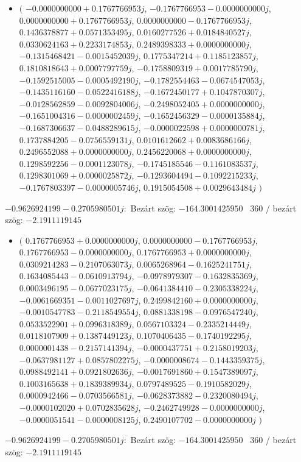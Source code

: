 \documentclass[14pt,a4paper]{article}
\begin{document}
\begin{itemize}
\item
$\big($
$-0.0000000000+0.1767766953j$, $-0.1767766953-0.0000000000j$, $0.0000000000+0.1767766953j$, $0.0000000000-0.1767766953j$, $0.1436378877+0.0571353495j$, $0.0160277526+0.0184840527j$, $0.0330624163+0.2233174853j$, $0.2489398333+0.0000000000j$, $-0.1315468421-0.0015452039j$, $0.1775347214+0.1185123857j$, $0.1810818643+0.0007797759j$, $-0.1758809319+0.0017785790j$, $-0.1592515005-0.0005492190j$, $-0.1782554463-0.0674547053j$, $-0.1435116160-0.0522416188j$, $-0.1672450177+0.1047870307j$, $-0.0128562859-0.0092804006j$, $-0.2498052405+0.0000000000j$, $-0.1651004316-0.0000002459j$, $-0.1652456329-0.0000135884j$, $-0.1687306637-0.0488289615j$, $-0.0000022598+0.0000000781j$, $0.1737884205-0.0756559131j$, $0.0101612662+0.0083686166j$, $0.2496552088+0.0000000000j$, $0.2456220068+0.0000000000j$, $0.1298592256-0.0001123078j$, $-0.1745185546-0.1161083537j$, $0.1298301069+0.0000025872j$, $-0.1293604494-0.1092215233j$, $-0.1767803397-0.0000005746j$, $0.1915054508+0.0029643484j$
$\big)$
\end{itemize}
$-0.9626924199-0.2705980501j$:\
Bezárt szög: $-164.3001425950$ \
360 / bezárt szög: $-2.1911119145$\
\begin{itemize}
\item
$\big($
$0.1767766953+0.0000000000j$, $0.0000000000-0.1767766953j$, $0.1767766953-0.0000000000j$, $0.1767766953+0.0000000000j$, $0.0309214283-0.2107063073j$, $0.0065268964-0.1625241751j$, $0.1634085443-0.0610913794j$, $-0.0978979307-0.1632835369j$, $0.0003496195-0.0677023175j$, $-0.0641384410-0.2305338224j$, $-0.0061669351-0.0011027697j$, $0.2499842160+0.0000000000j$, $-0.0010547783-0.2118549554j$, $0.0881338198-0.0976547240j$, $0.0533522901+0.0996318389j$, $0.0567103324-0.2335214449j$, $0.0118107909+0.1387449123j$, $0.1070406435-0.1740192295j$, $0.0000001438-0.2157141394j$, $-0.0000437751+0.2158019203j$, $-0.0637981127+0.0857802275j$, $-0.0000008674-0.1443359375j$, $0.0988492141+0.0921802636j$, $-0.0017691860+0.1547389097j$, $0.1003165638+0.1839389934j$, $0.0797489525-0.1910582029j$, $0.0000942466-0.0703566581j$, $-0.0628373882-0.2320080494j$, $-0.0000102020+0.0702835628j$, $-0.2462749928-0.0000000000j$, $-0.0000051541-0.0000008125j$, $0.2490107702-0.0000000000j$
$\big)$
\end{itemize}
$-0.9626924199-0.2705980501j$:\
Bezárt szög: $-164.3001425950$ \
360 / bezárt szög: $-2.1911119145$\
\end{document}

